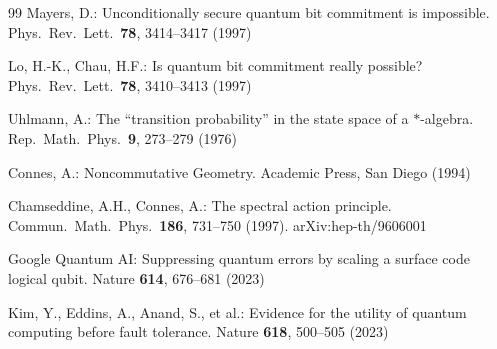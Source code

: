 \documentclass[11pt]{article}
\theoremstyle{remark}
\begin{document}
\begin{thebibliography}{99}
 Mayers, D.: Unconditionally secure quantum bit commitment is impossible. Phys.\ Rev.\ Lett.\ \textbf{78}, 3414--3417 (1997)

 Lo, H.-K., Chau, H.F.: Is quantum bit commitment really possible? Phys.\ Rev.\ Lett.\ \textbf{78}, 3410--3413 (1997)

 Uhlmann, A.: The ``transition probability'' in the state space of a $*$-algebra. Rep.\ Math.\ Phys.\ \textbf{9}, 273--279 (1976)

 Connes, A.: Noncommutative Geometry. Academic Press, San Diego (1994)

 Chamseddine, A.H., Connes, A.: The spectral action principle. Commun.\ Math.\ Phys.\ \textbf{186}, 731--750 (1997). arXiv:hep-th/9606001

 Google Quantum AI: Suppressing quantum errors by scaling a surface code logical qubit. Nature \textbf{614}, 676--681 (2023)

 Kim, Y., Eddins, A., Anand, S., et al.: Evidence for the utility of quantum computing before fault tolerance. Nature \textbf{618}, 500--505 (2023)

\end{thebibliography}
\end{document}
